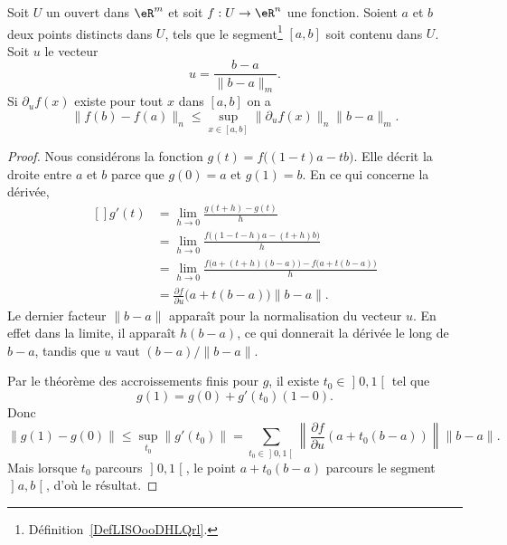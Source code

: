 \begin{theorem}\label{val_medio_1}
	Soit \( U\) un ouvert dans \( \eR^m\) et soit \( f:U\to\eR^n\) une fonction. Soient \( a\) et \( b\) deux points distincts dans \( U\), tels que le segment\footnote{Définition~\ref{DefLISOooDHLQrl}.} \( [a,b]\) soit contenu dans \( U\). Soit \( u\) le vecteur
	\[
		u=\frac{b-a}{\|b-a\|_m}.
	\]
	Si \( \partial_u f(x)\) existe pour tout \( x\) dans \( [a,b]\) on a
	\[
		\|f(b)-f(a)\|_n\leq \sup_{x\in[a,b]}\|\partial_uf(x)\|_n\|b-a\|_m.
	\]
\end{theorem}

\begin{proof}
	Nous considérons la fonction \( g(t)=f\big( (1-t)a-tb \big)\). Elle décrit la droite entre \( a\) et \( b\) parce que \( g(0)=a\) et \( g(1)=b\). En ce qui concerne la dérivée,
	\begin{equation}
		\begin{aligned}[]
			g'(t) & =\lim_{h\to 0} \frac{ g(t+h)-g(t) }{ h }                                     \\
			      & =\lim_{h\to 0} \frac{ f\big( (1-t-h)a-(t+h)b \big) }{ h }                    \\
			      & =\lim_{h\to 0} \frac{ f\big( a+(t+h)(b-a) \big)-f\big( a+t(b-a) \big) }{ h } \\
			      & =\frac{ \partial f }{ \partial u }\big( a+t(b-a) \big)\| b-a \|.
		\end{aligned}
	\end{equation}
	Le dernier facteur \( \| b-a \|\) apparaît pour la normalisation du vecteur \( u\). En effet dans la limite, il apparaît \( h(b-a)\), ce qui donnerait la dérivée le long de \( b-a\), tandis que \( u\) vaut \( (b-a)/\| b-a \|\).

	Par le théorème des accroissements finis pour \( g\), il existe \( t_0\in\mathopen] 0 , 1 \mathclose[\) tel que
		\begin{equation}
			g(1)=g(0)+g'(t_0)(1-0).
		\end{equation}
		Donc
		\begin{equation}
			\| g(1)-g(0) \|\leq\sup_{t_0}\| g'(t_0) \|=\sum_{t_0\in\mathopen] 0 , 1 \mathclose[}\left\| \frac{ \partial f }{ \partial u }(a+t_0(b-a)) \right\|\| b-a \|.
		\end{equation}
		Mais lorsque \( t_0\) parcours \( \mathopen] 0 , 1 \mathclose[\), le point \( a+t_0(b-a)\) parcours le segment \( \mathopen] a , b \mathclose[\), d'où le résultat.
\end{proof}

